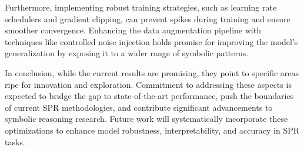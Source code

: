 \documentclass{article}
\begin{document}
Furthermore, implementing robust training strategies, such as learning rate schedulers and gradient clipping, can prevent spikes during training and ensure smoother convergence. Enhancing the data augmentation pipeline with techniques like controlled noise injection holds promise for improving the model's generalization by exposing it to a wider range of symbolic patterns.

In conclusion, while the current results are promising, they point to specific areas ripe for innovation and exploration. Commitment to addressing these aspects is expected to bridge the gap to state-of-the-art performance, push the boundaries of current SPR methodologies, and contribute significant advancements to symbolic reasoning research. Future work will systematically incorporate these optimizations to enhance model robustness, interpretability, and accuracy in SPR tasks.
\end{document}
